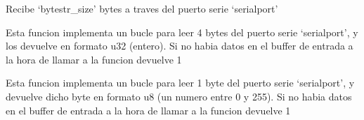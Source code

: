 \documentclass[letterpaper,10pt,english]{sphinxmanual}
\begin{document}

\begin{fulllineitems}
\label{\detokenize{myfpga:myfpga.interfaz_pcps.receive_bytestr}}
\pysigstartsignatures
{}
\pysigstopsignatures
\sphinxAtStartPar
Recibe ‘bytestr\_size’ bytes a traves del puerto serie ‘serialport’

\end{fulllineitems}


\begin{fulllineitems}
\label{\detokenize{myfpga:myfpga.interfaz_pcps.receive_u32}}
\pysigstartsignatures
{}
\pysigstopsignatures
\sphinxAtStartPar
Esta funcion implementa un bucle para leer 4 bytes del puerto serie
‘serialport’, y los devuelve en formato u32 (entero). Si no habia
datos en el buffer de entrada a la hora de llamar a la funcion
devuelve \sphinxhyphen{}1

\end{fulllineitems}


\begin{fulllineitems}
\label{\detokenize{myfpga:myfpga.interfaz_pcps.receive_u8}}
\pysigstartsignatures
{}
\pysigstopsignatures
\sphinxAtStartPar
Esta funcion implementa un bucle para leer 1 byte del puerto serie
‘serialport’, y devuelve dicho byte en formato u8 (un numero entre 0 y 255).
Si no habia datos en el buffer de entrada a la hora de llamar a la
funcion devuelve \sphinxhyphen{}1

\end{fulllineitems}
\end{document}
